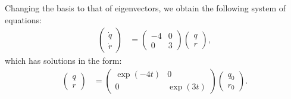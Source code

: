 \documentclass[12pt,letterpaper]{article}
\begin{document}
\begin{enumerate}[label=(\alph*)]
	      Changing the basis to that of eigenvectors, we obtain the following system of equations:
	      \begin{align}
		      \begin{pmatrix}
			      \dot{q} \\
			      \dot{r}
		      \end{pmatrix} & =
		      \begin{pmatrix}
			      -4 & 0 \\
			      0  & 3
		      \end{pmatrix}
		      \begin{pmatrix}
			      q \\
			      r
		      \end{pmatrix},
	      \end{align}
	      which has solutions in the form:
	      \begin{align}
		      \begin{pmatrix}
			      q \\
			      r
		      \end{pmatrix} & =
		      \begin{pmatrix}
			      \exp(-4t) & 0        \\
			      0         & \exp(3t)
		      \end{pmatrix}
		      \begin{pmatrix}
			      q_0 \\
			      r_0
		      \end{pmatrix}.
	      \end{align}


\end{enumerate}
\end{document}
